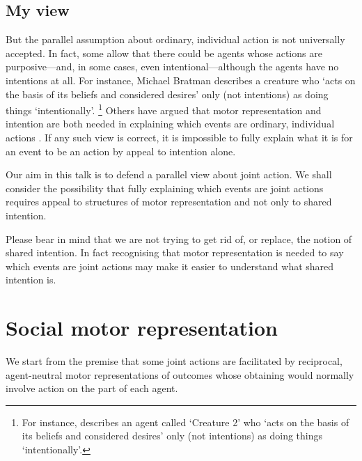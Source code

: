 \documentclass[12pt,\papersize]{extarticle}
\begin{document}
\subsection{My view}
But the parallel assumption about ordinary, individual action is not universally accepted. 
In fact, some allow that there could be agents whose actions are purposive---and, in some cases, even intentional---although  the agents have no intentions at all.
For instance, Michael Bratman describes a creature who `acts on the basis of its beliefs and considered desires' only (not intentions) as doing things `intentionally'.%
\footnote{
For instance, \citet[p.\ 251]{bratman:2000_valuing} %
describes an agent called `Creature 2' who `acts on the basis of its beliefs and considered desires' only (not intentions) as doing things `intentionally'.
}
Others have argued that motor representation and intention are both needed in explaining which events are ordinary, individual actions \citep{pacherie:2000_content,butterfill:2012_intention}.
If any such view is correct, it is impossible to fully explain what it is for an event to be an action by appeal to intention alone.

Our aim in this talk is to defend a parallel view about joint action. 
We shall consider the possibility that fully explaining which events are joint actions requires appeal to structures of motor representation and not only to shared intention.

Please bear in mind that we are not trying to get rid of, or replace, the notion of shared intention.
In fact recognising that motor representation is needed to say which events are joint actions may make it easier to understand what shared intention is.



\section{Social motor representation}
We start from the premise that some joint actions are facilitated by reciprocal, agent-neutral motor representations of outcomes whose obtaining would normally involve action on the part of each agent.
\end{document}
